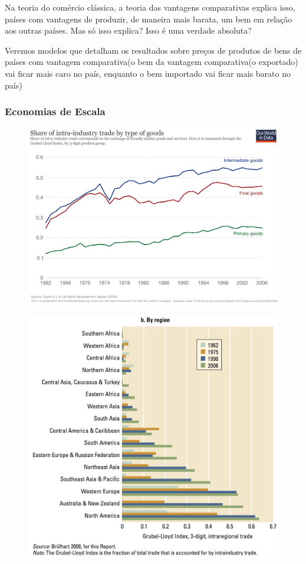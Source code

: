 \documentclass[a4paper,12pt]{article}[abntex2]
\begin{document}
Na teoria do comércio clássica, a teoria das vantagens comparativas explica isso, países com vantagens de produzir, de maneira mais barata, um bem em relação aos outras países. Mas só isso explica? Isso é uma verdade absoluta?

Veremos modelos que detalham os resultados sobre preços de produtos de bens de países com vantagem comparativa(o bem da vantagem comparativa(o exportado) vai ficar mais caro no país, enquanto o bem importado vai ficar mais barato no país)

\subsubsection{\textbf{Economias de Escala}}
\begin{figure}[H]
    \centering
    \includegraphics[width=0.70\linewidth]{Imagens/a1i11.png}
\end{figure}

\begin{figure}[H]
    \centering
    \includegraphics[width=0.70\linewidth]{Imagens/a1i12.png}
\end{figure}
\end{document}
